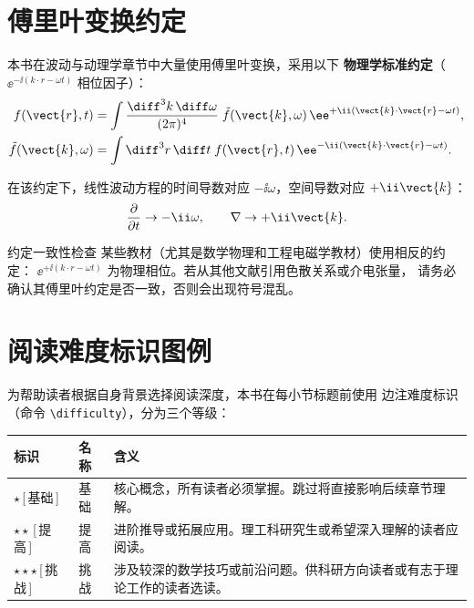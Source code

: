 \section*{傅里叶变换约定}

本书在波动与动理学章节中大量使用傅里叶变换，采用以下
\textbf{物理学标准约定}（$\ee^{-\ii(k\cdot r-\omega t)}$ 相位因子）：
\begin{align}
f(\vect{r},t) &= \int \frac{\diff^3 k\,\diff\omega}{(2\pi)^4}\;
\tilde{f}(\vect{k},\omega)\,\ee^{+\ii(\vect{k}\cdot\vect{r}-\omega t)}, \\
\tilde{f}(\vect{k},\omega) &= \int \diff^3 r\,\diff t\;
f(\vect{r},t)\,\ee^{-\ii(\vect{k}\cdot\vect{r}-\omega t)}.
\end{align}

在该约定下，线性波动方程的时间导数对应 $-\ii\omega$，空间导数对应 $+\ii\vect{k}$：
\[
\frac{\partial}{\partial t} \to -\ii\omega, \qquad \nabla \to +\ii\vect{k}.
\]

\begin{warning}{约定一致性检查}{}
某些教材（尤其是数学物理和工程电磁学教材）使用相反的约定：
$\ee^{+\ii(k\cdot r-\omega t)}$ 为物理相位。若从其他文献引用色散关系或介电张量，
请务必确认其傅里叶约定是否一致，否则会出现符号混乱。
\end{warning}


\section*{阅读难度标识图例}

为帮助读者根据自身背景选择阅读深度，本书在每小节标题前使用
边注难度标识（命令 \texttt{\textbackslash difficulty}），分为三个等级：

\begin{table}[htbp]
\centering
\begin{tabular}{@{}llp{8cm}@{}}
\toprule
\textbf{标识} & \textbf{名称} & \textbf{含义} \\
\midrule
$\star$\,[\,基础\,] & 基础 & 核心概念，所有读者必须掌握。跳过将直接影响后续章节理解。 \\
$\star\star$\,[\,提高\,] & 提高 & 进阶推导或拓展应用。理工科研究生或希望深入理解的读者应阅读。 \\
$\star\star\star$\,[\,挑战\,] & 挑战 & 涉及较深的数学技巧或前沿问题。供科研方向读者或有志于理论工作的读者选读。 \\
\bottomrule
\end{tabular}
\end{table}

